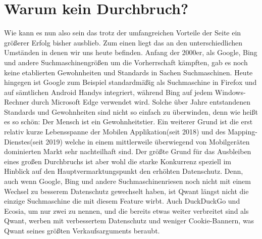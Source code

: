 \section{Warum kein Durchbruch?}\label{sec:warum-kein-durchbruch?}
Wie kann es nun also sein das trotz der umfangreichen Vorteile der Seite ein größerer Erfolg bisher ausblieb.
Zum einen liegt das an den unterschiedlichen Umständen in denen wir uns heute befinden.
Anfang der 2000er, als Google, Bing und andere Suchmaschinengrößen um die Vorherrschaft kämpften, gab es noch keine
etablierten Gewohnheiten und Standards in Sachen Suchmaschinen.
Heute hingegen ist Google zum Beispiel standardmäßig als Suchmaschine in Firefox und auf sämtlichen Android Handys
integriert, während Bing auf jedem Windows-Rechner durch Microsoft Edge verwendet wird.
Solche über Jahre entstandenen Standards und Gewohnheiten sind nicht so einfach zu überwinden, denn wie heißt es so
schön: Der Mensch ist ein Gewohnheitstier.
Ein weiterer Grund ist die erst relativ kurze Lebensspanne der Mobilen Applikation(seit 2018) und des Mapping-Dienstes(seit 2019)
welche in einem mittlerweile überwiegend von Mobilgeräten dominierten Markt sehr nachteilhaft sind.
Der größte Grund für das Ausbleiben eines großen Durchbruchs ist aber wohl die starke Konkurrenz speziell im Hinblick auf
den Hauptvermarktungspunkt den erhöhten Datenschutz.
Denn, auch wenn Google, Bing und andere Suchmaschinenriesen noch nicht mit einem Wechsel zu besserem Datenschutz gewechselt
haben, ist Qwant längst nicht die einzige Suchmaschine die mit diesem Feature wirbt.
Auch DuckDuckGo und Ecosia, um nur zwei zu nennen, und die bereits etwas weiter verbreitet sind als Qwant, werben mit
verbessertem Datenschutz und weniger Cookie-Bannern, was Qwant seines größten Verkaufsarguments beraubt.